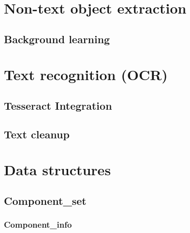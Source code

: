 \documentclass[a4]{book}
\begin{document}
\chapter{Non-text object extraction}

\section{Background learning}


\chapter{Text recognition (OCR)}

\section{Tesseract Integration}


\section{Text cleanup}


\chapter{Data structures}

\section{Component\_set}
\subsection{Component\_info}

\end{document}
